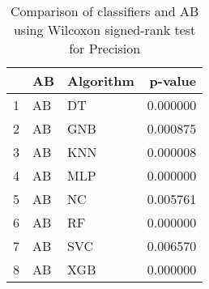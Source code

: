 \begin{table}
\footnotesize
\caption{Comparison of classifiers and AB using Wilcoxon signed-rank test for Precision}
\label{tab:AB wilcoxon Precision comparison}
\begin{tabular}{lllr}
\hline
 & AB & Algorithm & p-value \\
\hline
1 & AB & DT & 0.000000 \\
2 & AB & GNB & 0.000875 \\
3 & AB & KNN & 0.000008 \\
4 & AB & MLP & 0.000000 \\
5 & AB & NC & 0.005761 \\
6 & AB & RF & 0.000000 \\
7 & AB & SVC & 0.006570 \\
8 & AB & XGB & 0.000000 \\
\hline
\end{tabular}
\end{table}
